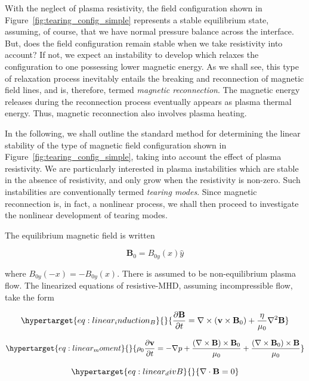 \documentclass[
  notoc %
]{tufte-book}
\begin{document}
With the neglect of plasma resistivity, the field configuration shown in
Figure~\ref{fig:tearing_config_simple} represents a stable equilibrium
state, assuming, of course, that we have normal pressure balance across
the interface. But, does the field configuration remain stable when we
take resistivity into account? If not, we expect an instability to
develop which relaxes the configuration to one possessing lower magnetic
energy. As we shall see, this type of relaxation process inevitably
entails the breaking and reconnection of magnetic field lines, and is,
therefore, termed \emph{magnetic reconnection}. The magnetic energy
releases during the reconnection process eventually appears as plasma
thermal energy. Thus, magnetic reconnection also involves plasma
heating.

In the following, we shall outline the standard method for determining
the linear stability of the type of magnetic field configuration shown
in Figure~\ref{fig:tearing_config_simple}, taking into account the
effect of plasma resistivity. We are particularly interested in plasma
instabilities which are stable in the absence of resistivity, and only
grow when the resistivity is non-zero. Such instabilities are
conventionally termed \emph{tearing modes}. Since magnetic reconnection
is, in fact, a nonlinear process, we shall then proceed to investigate
the nonlinear development of tearing modes.

The equilibrium magnetic field is written

\[
\mathbf{B}_0=B_{0y}(x)\hat{y}
\]

where \(B_{0y}(-x)=-B_{0y}(x)\). There is assumed to be non-equilibrium
plasma flow. The linearized equations of resistive-MHD, assuming
incompressible flow, take the form

\begin{equation}\protect\hypertarget{eq:linear_induction_B}{}{
\frac{\partial \mathbf{B}}{\partial t}=\nabla\times(\mathbf{v}\times\mathbf{B}_0)+\frac{\eta}{\mu_0}\nabla^2\mathbf{B}
}\label{eq:linear_induction_B}\end{equation}

\begin{equation}\protect\hypertarget{eq:linear_moment}{}{
\rho_0\frac{\partial\mathbf{v}}{\partial t}=-\nabla p +\frac{(\nabla\times\mathbf{B})\times\mathbf{B}_0}{\mu_0}+\frac{(\nabla\times\mathbf{B}_0)\times\mathbf{B}}{\mu_0}
}\label{eq:linear_moment}\end{equation}

\begin{equation}\protect\hypertarget{eq:linear_divB}{}{
\nabla\cdot\mathbf{B}=0
}\label{eq:linear_divB}\end{equation}
\end{document}
